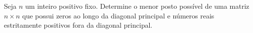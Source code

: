 Seja \(n\) um inteiro positivo fixo. Determine o menor posto possível de uma matriz \(n \times n\) que possui zeros ao longo da diagonal principal e números reais estritamente positivos fora da diagonal principal.
